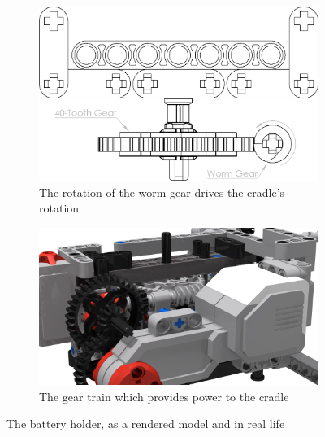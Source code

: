 \documentclass{report}
\begin{document}
	\begin{figure}[H]
		\centering
		\begin{subfigure}[b]{0.37999\textwidth}
			\includegraphics[width=\textwidth]{Resources/Images/dwgCradleWormGear.png}
			\caption{The rotation of the worm gear drives the cradle's rotation}
			\label{fig:dwgCradleWormGear}
		\end{subfigure}
		\hspace{10mm}
		\begin{subfigure}[b]{0.42014\textwidth}
			\includegraphics[width=\textwidth]{Resources/Images/rdrCradleWormGear.png}
			\caption{The gear train which provides power to the cradle}
			\label{fig:rdrCradleWormGear}
		\end{subfigure}
		\caption{The battery holder, as a rendered model and in real life}
		\label{fig:cradleWormGear}
	\end{figure}
	
\end{document}
